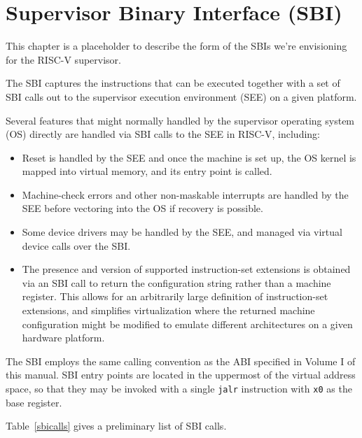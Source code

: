 \chapter{Supervisor Binary Interface (SBI)}

This chapter is a placeholder to describe the form of the SBIs we're
envisioning for the RISC-V supervisor.

The SBI captures the instructions that can be executed together with a
set of SBI calls out to the supervisor execution environment (SEE) on
a given platform.

Several features that might normally handled by the supervisor
operating system (OS) directly are handled via SBI calls to the SEE in
RISC-V, including:

\begin{itemize}

\item Reset is handled by the SEE and once the machine is set up, the
  OS kernel is mapped into virtual memory, and its entry point is called.

\item Machine-check errors and other non-maskable interrupts are
  handled by the SEE before vectoring into the OS if recovery is
  possible.

\item Some device drivers may be handled by the SEE, and managed via
  virtual device calls over the SBI.

\item The presence and version of supported instruction-set extensions
  is obtained via an SBI call to return the configuration string
  rather than a machine register.  This allows for an arbitrarily
  large definition of instruction-set extensions, and simplifies
  virtualization where the returned machine configuration might be
  modified to emulate different architectures on a given hardware
  platform.

\end{itemize}

The SBI employs the same calling convention as the ABI specified in Volume
I of this manual.  SBI entry points are located in the uppermost
 of the virtual address space, so that they may be invoked with
a single {\tt jalr} instruction with {\tt x0} as the base register.

Table~\ref{sbicalls} gives a preliminary list of SBI calls.

